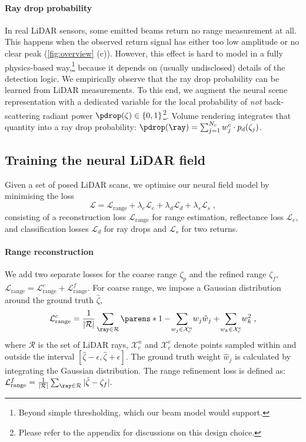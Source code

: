 \paragraph{Ray drop probability}
In real LiDAR sensors, some emitted beams return no range measurement at all. This happens when the observed return signal has either too low amplitude or no clear peak (\cref{fig:overview} (c)). However, this effect is hard to model in a fully physics-based way,\footnote{Beyond simple thresholding, which our beam model would support.} because it depends on (usually undisclosed) details of the detection logic. We empirically observe that the ray drop probability can be learned from LiDAR measurements. To this end, we augment the neural scene representation with a dedicated variable for the local probability of \textit{not} back-scattering radiant power $\pdrop(\zeta) \in \{0, 1\}$\footnote{Please refer to the appendix for discussions on this design choice.}. 
Volume rendering integrates that quantity into a ray drop probability: $\pdrop(\ray) = \sum_{j=1}^{N_c} w_j^c\cdot p_d(\zeta_j)$.


\subsection{Training the neural LiDAR field}
\label{sec:opt}
Given a set of posed LiDAR scans, we optimise our neural field model by minimising the loss
\begin{equation}
    \mathcal{L} = \mathcal{L}_{\text{range}} + \lambda_e \mathcal{L}_{e} + \lambda_d \mathcal{L}_{d} + \lambda_s\mathcal{L}_s\;,
\label{eq:loss}
\end{equation}
consisting of a reconstruction loss $\mathcal{L}_{\text{range}}$ for range estimation, reflectance loss $\mathcal{L}_{e}$, and classification losses $\mathcal{L}_{d}$ for ray drops and $\mathcal{L}_s$ for two returns. 


\paragraph{Range reconstruction}
We add two separate losses for the coarse range $\zeta_p$ and the refined range $\zeta_f$, $\mathcal{L}_{\text{range}} = \mathcal{L}_{\text{range}}^c + \mathcal{L}_{\text{range}}^f$. For coarse range, we impose a Gaussian distribution~\cite{rematas2021urban} around the ground truth $\hat{\zeta}$, 
\begin{equation}
    \mathcal{L}_{\text{range}}^c = \frac{1}{|\mathcal{R}|} \sum_{\ray \in \mathcal{R}} \parens*{1-\!\sum_{w_j \in \mathcal{X}_c^n}\!w_j \hat{w}_j+\!\sum_{w_k \in \mathcal{X}_c^e}\!w_k^2}\;,
\end{equation}
where $\mathcal{R}$ is the set of LiDAR rays, $\mathcal{X}_c^n$ and $\mathcal{X}_c^e$ denote points sampled within and outside the interval $[\hat{\zeta}-\epsilon,\hat{\zeta}+\epsilon]$. The ground truth weight $\hat{w}_j$ is calculated by integrating the Gaussian distribution.
The range refinement loss is defined as: $\mathcal{L}_{\text{range}}^f = \frac{1}{|\mathcal{R}|} \sum_{\ray \in \mathcal{R}} |\hat{\zeta} - \zeta_f|.$


